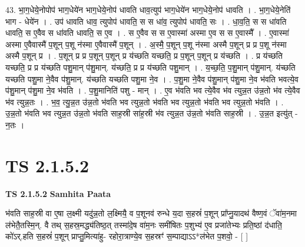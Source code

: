 \documentclass[17pt]{extarticle}
\begin{document}
43. भा॒ग॒धेये॒नोपोप॑ भाग॒धेये॑न भाग॒धेये॒नोप॑ धावति धाव॒त्युप॑ भाग॒धेये॑न भाग॒धेये॒नोप॑ धावति । . भा॒ग॒धेये॒नेति॑ भाग - धेये॑न । . उप॑ धावति धाव॒ त्युपोप॑ धावति॒ स स धा॑व॒ त्युपोप॑ धावति॒ सः । . धा॒व॒ति॒ स स धा॑वति धावति॒ स ए॒वैव स धा॑वति धावति॒ स ए॒व । . स ए॒वैव स स ए॒वास्मा॑ अस्मा ए॒व स स ए॒वास्मै᳚ । . ए॒वास्मा॑ अस्मा ए॒वैवास्मै॑ प॒शून् प॒शू न॑स्मा ए॒वैवास्मै॑ प॒शून् । . अ॒स्मै॒ प॒शून् प॒शू न॑स्मा अस्मै प॒शून् प्र प्र प॒शू न॑स्मा अस्मै प॒शून् प्र । . प॒शून् प्र प्र प॒शून् प॒शून् प्र य॑च्छति यच्छति॒ प्र प॒शून् प॒शून् प्र य॑च्छति । . प्र य॑च्छति यच्छति॒ प्र प्र य॑च्छति पशु॒मान् प॑शु॒मान्. य॑च्छति॒ प्र प्र य॑च्छति पशु॒मान् । . य॒च्छ॒ति॒ प॒शु॒मान् प॑शु॒मान्. य॑च्छति यच्छति पशु॒मा ने॒वैव प॑शु॒मान्. य॑च्छति यच्छति पशु॒मा ने॒व । . प॒शु॒मा ने॒वैव प॑शु॒मान् प॑शु॒मा ने॒व भ॑वति भवत्ये॒व प॑शु॒मान् प॑शु॒मा ने॒व भ॑वति । . प॒शु॒मानिति॑ पशु - मान् । . ए॒व भ॑वति भव त्ये॒वैव भ॑व त्युन्न॒त उ॑न्न॒तो भ॑व त्ये॒वैव भ॑व त्युन्न॒तः । . भ॒व॒ त्यु॒न्न॒त उ॑न्न॒तो भ॑वति भव त्युन्न॒तो भ॑वति भव त्युन्न॒तो भ॑वति भव त्युन्न॒तो भ॑वति । . उ॒न्न॒तो भ॑वति भव त्युन्न॒त उ॑न्न॒तो भ॑वति साह॒स्री सा॑ह॒स्री भ॑व त्युन्न॒त उ॑न्न॒तो भ॑वति साह॒स्री । . उ॒न्न॒त इत्यु॑त् - न॒तः । \newline
\pagebreak
{}

\section{ TS 2.1.5.2 }

\textbf{TS 2.1.5.2 } \newline
\textbf{Samhita Paata} \newline

भ॑वति साह॒स्री वा ए॒षा ल॒क्ष्मी यदु॑न्न॒तो ल॒क्ष्मियै॒ व प॒शूनव॑ रुन्धे य॒दा स॒हस्रं॑ प॒शून् प्रा᳚प्नु॒यादथ॑ वैष्ण॒वं ॅवा॑म॒नमा ल॑भेतै॒तस्मि॒न्. वै तथ् स॒हस्र॒मद्ध्य॑तिष्ठ॒त् तस्मा॑दे॒ष वा॑म॒नः समी॑षितः प॒शुभ्य॑ ए॒व प्रजा॑तेभ्यः प्रति॒ष्ठां द॑धाति॒ को॑ऽर्.हति स॒हस्रं॑ प॒शून् प्राप्तु॒मित्या॑हु- रहोरा॒त्राण्ये॒व स॒हस्रꣳ॑ स॒म्पाद्याऽऽ*ल॑भेत प॒शवो॒ - [  ] \newline
\end{document}
